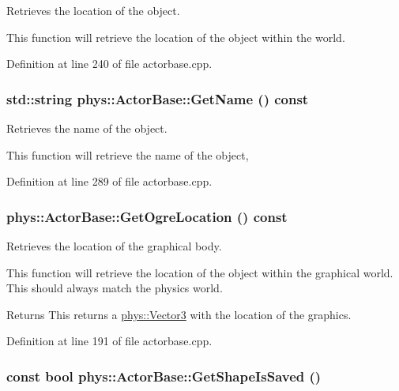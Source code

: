 Retrieves the location of the object. 

This function will retrieve the location of the object within the world. 

Definition at line 240 of file actorbase.cpp.

\hypertarget{classphys_1_1ActorBase_afc1851d7445c98a9389b3902a214a5e1}{
\subsubsection[{GetName}]{\setlength{\rightskip}{0pt plus 5cm}std::string phys::ActorBase::GetName () const}}
\label{d8/d0f/classphys_1_1ActorBase_afc1851d7445c98a9389b3902a214a5e1}


Retrieves the name of the object. 

This function will retrieve the name of the object, 

Definition at line 289 of file actorbase.cpp.

\hypertarget{classphys_1_1ActorBase_a12ef0a2625e2fdf506ea8e23e0a378fa}{
\subsubsection[{GetOgreLocation}]{ phys::ActorBase::GetOgreLocation () const}}
\label{d8/d0f/classphys_1_1ActorBase_a12ef0a2625e2fdf506ea8e23e0a378fa}


Retrieves the location of the graphical body. 

This function will retrieve the location of the object within the graphical world. This should always match the physics world. \begin{DoxyReturn}{Returns}
This returns a \hyperlink{classphys_1_1Vector3}{phys::Vector3} with the location of the graphics. 
\end{DoxyReturn}


Definition at line 191 of file actorbase.cpp.

\hypertarget{classphys_1_1ActorBase_ace1d04b4fbb21823cde3feee83d17c2f}{
\subsubsection[{GetShapeIsSaved}]{\setlength{\rightskip}{0pt plus 5cm}const bool phys::ActorBase::GetShapeIsSaved ()}}
\label{d8/d0f/classphys_1_1ActorBase_ace1d04b4fbb21823cde3feee83d17c2f}


